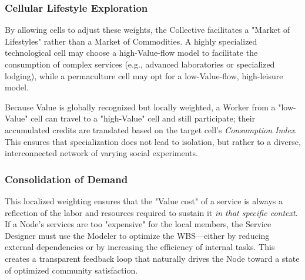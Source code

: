 \subsubsection{Cellular Lifestyle Exploration}
By allowing cells to adjust these weights, the Collective facilitates a "Market of Lifestyles" rather than a Market of Commodities. A highly specialized technological cell may choose a high-Value-flow model to facilitate the consumption of complex services (e.g., advanced laboratories or specialized lodging), while a permaculture cell may opt for a low-Value-flow, high-leisure model. 

Because Value is globally recognized but locally weighted, a Worker from a "low-Value" cell can travel to a "high-Value" cell and still participate; their accumulated credits are translated based on the target cell's \textit{Consumption Index}. This ensures that specialization does not lead to isolation, but rather to a diverse, interconnected network of varying social experiments.

\subsubsection{Consolidation of Demand}
This localized weighting ensures that the "Value cost" of a service is always a reflection of the labor and resources required to sustain it \textit{in that specific context}. If a Node’s services are too "expensive" for the local members, the Service Designer must use the Modeler to optimize the WBS—either by reducing external dependencies or by increasing the efficiency of internal tasks. This creates a transparent feedback loop that naturally drives the Node toward a state of optimized community satisfaction.
